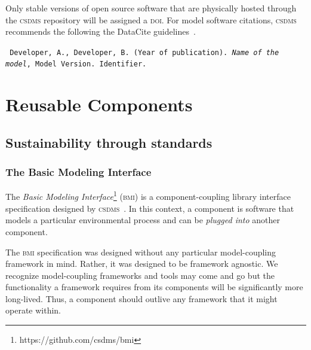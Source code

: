 \documentclass[11pt, oneside]{amsart}
\DeclareRobustCommand{\csdms}{\textsc{csdms}}
\DeclareRobustCommand{\doi}{\textsc{doi}}
\DeclareRobustCommand{\bmi}{\textsc{bmi}}
\begin{document}

Only stable versions of open source
software that are physically hosted through the \csdms{} repository will be
assigned a \doi{}. For model software citations, \csdms{} recommends the
following the DataCite guidelines~\cite{brase2009datacite}.

\begin{shaded}
\leftskip 0.25in
\parindent -0.25in
\tt{
Developer, A., Developer, B. (Year of publication). \emph{Name of the model},
Model Version. Identifier.
}
\end{shaded}

\section{Reusable Components}
\label{sec:reusable}

\subsection{Sustainability through standards}

\subsubsection{The Basic Modeling Interface}
\label{sec:bmi}

The \emph{Basic Modeling Interface}\footnote{https://github.com/csdms/bmi}
(\bmi{}) is a component-coupling library
interface specification designed by \csdms~\cite{peckham2012component,
syvitski2014plug}.  In this context, a component is software that models a
particular environmental process and can be \emph{plugged into} another
component.

The \bmi{} specification was designed without any particular model-coupling
framework in mind.  Rather, it was designed to be framework agnostic. We
recognize model-coupling frameworks and tools may come and go but the
functionality a framework requires from its components will be significantly
more long-lived. Thus, a component should outlive any framework that it might
operate within.
\end{document}
